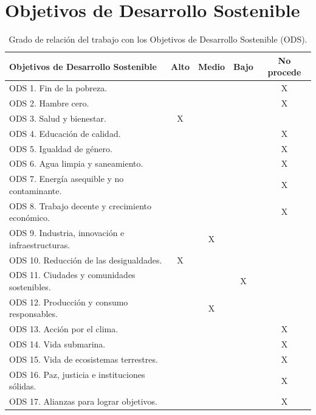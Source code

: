 \documentclass[11pt,spanish,listoffigures,listoftables]{tfgetsinf}
\begin{document}

\APPENDIX


\chapter{Objetivos de Desarrollo Sostenible}

\begin{table}[H]
\centering
\caption{Grado de relación del trabajo con los Objetivos de Desarrollo Sostenible (\ac{ODS}).}
\begin{tabular}{|p{7cm}|c|c|c|c|}
\hline
\textbf{Objetivos de Desarrollo Sostenible} & \textbf{Alto} & \textbf{Medio} & \textbf{Bajo} & \textbf{No procede} \\
\hline
ODS 1. Fin de la pobreza. & & & & X \\
ODS 2. Hambre cero. & & & & X \\
ODS 3. Salud y bienestar. & X & & & \\
ODS 4. Educación de calidad. & & & & X \\
ODS 5. Igualdad de género. & & & & X \\
ODS 6. Agua limpia y saneamiento. & & & & X \\
ODS 7. Energía asequible y no contaminante. & & & & X \\
ODS 8. Trabajo decente y crecimiento económico. & & & & X \\
ODS 9. Industria, innovación e infraestructuras. & & X & & \\
ODS 10. Reducción de las desigualdades. & X & & & \\
ODS 11. Ciudades y comunidades sostenibles. & & & X & \\
ODS 12. Producción y consumo responsables. & & X & & \\
ODS 13. Acción por el clima. & & & & X \\
ODS 14. Vida submarina. & & & & X \\
ODS 15. Vida de ecosistemas terrestres. & & & & X \\
ODS 16. Paz, justicia e instituciones sólidas. & & & & X \\
ODS 17. Alianzas para lograr objetivos. & & & & X \\
\hline
\end{tabular}
\end{table}
\end{document}
